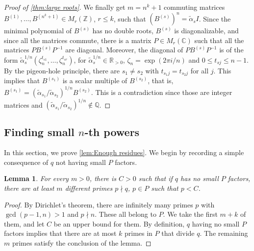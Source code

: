 \documentclass[12pt, a4paper]{amsart}
\numberwithin{equation}{section}
\newtheorem{lemma}[theorem]{Lemma}
\theoremstyle{definition}
\newcommand{\R}{\mathbb{R}}
\newcommand{\C}{\mathbb{C}}
\newcommand{\Q}{\mathbb{Q}}
\newcommand{\Z}{\mathbb{Z}}
\newcommand{\wt}{\widetilde}
\begin{document}
\begin{proof}[Proof of \cref{thm:large roots}]
	
We finally get $m=n^{k}+1$ commuting matrices $B^{(1)},\ldots,B^{(n^{k}+1)}\in M_{r}(\Z)$, $r\le k$, such that $(B^{(s)})^{n}=\wt\alpha_{s}I$. 
Since the minimal polynomial of $B^{(s)}$ has no double roots, 
$B^{(s)}$ is diagonalizable, and since all the matrices commute, 
there is a matrix $P \in M_r(\C)$ such that all the matrices $PB^{(s)}P^{-1}$ are diagonal. 
Moreover, the diagonal of $PB^{(s)}P^{-1}$ is of the form $\wt\alpha_{s}^{1/n}(\zeta_{n}^{t_{s1}},\ldots,\zeta_{n}^{t_{sr}})$,
for $\wt\alpha_{s}^{1/n}\in\R_{>0}$, $\zeta_{n}=\exp(2\pi i/n)$ and $0\le t_{sj}\le n-1$. 
By the pigeon-hole principle, there are $s_{1}\neq s_{2}$ with $t_{s_{1}j}=t_{s_{2}j}$ for all $j$. 
This implies that $B^{(s_{1})}$ is a scalar multiple of $B^{(s_{2})}$, that is, $B^{(s_{1})}=\left(\wt\alpha_{s_1}/\wt\alpha_{s_2}\right)^{1/n}B^{(s_2)}$.
This is a contradiction since those are integer matrices and $\left(\wt\alpha_{s_1}/\wt\alpha_{s_2}\right)^{1/n}\notin\Q$.
\end{proof}

\subsection{Finding small \texorpdfstring{$n$}{n}-th powers}\label{sec:n powers}
In this section, we prove \cref{lem:Enough residues}.
We begin by recording a simple consequence of $q$ not having small $P$ factors.

\begin{lemma}\label{lem:small primes exist}
For every $m>0$, there is $C>0$ such that if $q$ has
no small $P$ factors, there are at least $m$ different primes $p\nmid q$, $p\in P$ 
such that $p<C$. 
\end{lemma}
\begin{proof}
By Dirichlet's theorem, there are infinitely many primes $p$ with $\gcd(p-1,n)>1$ and $p\nmid n$.
These all belong to $P$.
We take the first $m+k$ of them, and let $C$ be an upper bound for them.
By definition, $q$ having no small $P$ factors implies that there are at most
$k$ primes in $P$ that divide $q$.
The remaining $m$ primes satisfy the conclusion of the lemma.
\end{proof}
\end{document}
